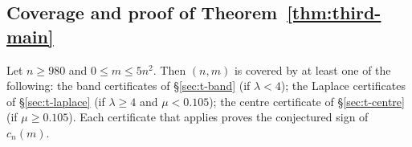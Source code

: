 \subsection{Coverage and proof of Theorem~\ref{thm:third-main}}\label{sec:t-coverage}

\begin{theorem}[coverage]\label{thm:t-coverage}
Let $n\ge980$ and $0\le m\le5n^2$. Then $(n,m)$ is covered by at least one of the following: the band certificates of
\S\ref{sec:t-band} (if $\lambda<4$); the Laplace certificates of \S\ref{sec:t-laplace} (if $\lambda\ge4$ and $\mu<0.105$);
the centre certificate of \S\ref{sec:t-centre} (if $\mu\ge0.105$). Each certificate that applies proves the conjectured
sign of $c_n(m)$.
\end{theorem}
